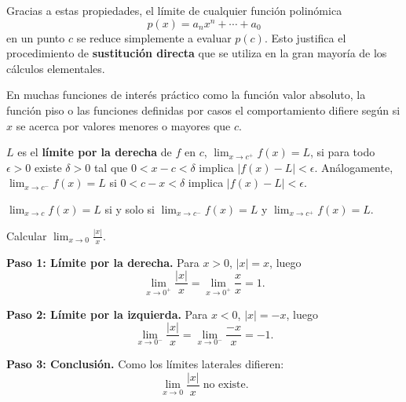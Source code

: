 \begin{rem}
Gracias a estas propiedades, el límite de cualquier función polinómica
\[
  p(x) = a_n x^n + \cdots + a_0
\]
en un punto $c$ se reduce simplemente a evaluar $p(c)$. Esto justifica el
procedimiento de \textbf{sustitución directa} que se utiliza en la gran
mayoría de los cálculos elementales.
\end{rem}

En muchas funciones de interés práctico como la función valor absoluto,
la función piso o las funciones definidas por casos el comportamiento
difiere según si $x$ se acerca por valores menores o mayores que $c$.

\begin{definition}
$L$ es el \textbf{límite por la derecha} de $f$ en $c$,
$\lim_{x\to c^+}f(x)=L$, si para todo $\epsilon>0$ existe $\delta>0$ tal
que $0<x-c<\delta$ implica $|f(x)-L|<\epsilon$. Análogamente,
$\lim_{x\to c^-}f(x)=L$ si $0<c-x<\delta$ implica $|f(x)-L|<\epsilon$.
\end{definition}

\begin{theorem}
$\lim_{x\to c}f(x) = L$ si y solo si
$\lim_{x\to c^-}f(x) = L$ \;y\; $\lim_{x\to c^+}f(x) = L$.
\end{theorem}

\begin{example}[Límite lateral de $|x|/x$ en $x=0$]
Calcular $\displaystyle\lim_{x\to 0}\frac{|x|}{x}$.

\begin{myproof}
\textbf{Paso 1: Límite por la derecha.} Para $x>0$, $|x|=x$, luego
\[
  \lim_{x\to 0^+}\frac{|x|}{x} = \lim_{x\to 0^+}\frac{x}{x} = 1.
\]

\textbf{Paso 2: Límite por la izquierda.} Para $x<0$, $|x|=-x$, luego
\[
  \lim_{x\to 0^-}\frac{|x|}{x} = \lim_{x\to 0^-}\frac{-x}{x} = -1.
\]

\textbf{Paso 3: Conclusión.} Como los límites laterales difieren:
\[
  \boxed{\lim_{x\to 0}\frac{|x|}{x} \;\text{no existe.}}
\]
\end{myproof}
\end{example}

